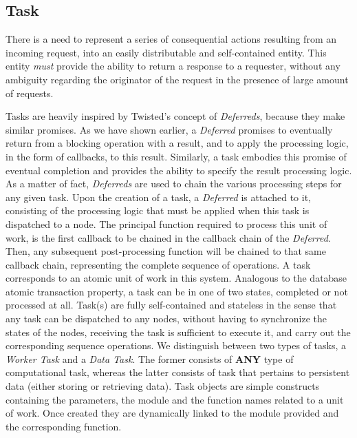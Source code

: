 \documentclass[12pt, titlepage]{uo_temp}
\begin{document}
     \subsection{Task}\label{impl_constructs_task}
     There is a need to represent a series of consequential actions resulting from an
     incoming request, into an easily distributable and self-contained entity. This entity
     \emph{must} provide the ability to return a response to a requester, without any
     ambiguity regarding the originator of the request in the presence of large amount of
     requests.
     
     Tasks are heavily inspired by Twisted's concept of \emph{Deferreds}, because they
     make similar promises. As we have shown earlier, a \emph{Deferred} promises to
     eventually return from a blocking operation with a result, and to apply the
     processing logic, in the form of callbacks, to this result. Similarly, a task
     embodies this promise of eventual completion and provides the ability to specify the
     result processing logic. As a matter of fact, \emph{Deferreds} are used to chain the
     various processing steps for any given task. Upon the creation of a task, a
     \emph{Deferred} is attached to it, consisting of the processing logic that must be
     applied when this task is dispatched to a node. The principal function required to
     process this unit of work, is the first callback to be chained in the callback chain
     of the \emph{Deferred}. Then, any subsequent post-processing function will be chained
     to that same callback chain, representing the complete sequence of operations.
     A task corresponds to an atomic unit of work in this system. Analogous to the
     database atomic transaction property, a task can be in one of two states, completed
     or not processed at all. Task(s) are fully self-contained and stateless in the sense
     that any task can be dispatched to any nodes, without having to synchronize the
     states of the nodes, receiving the task is sufficient to execute it, and carry out
     the corresponding sequence operations. We distinguish between two types of tasks, a
     \emph{Worker Task} and a \emph{Data Task}. The former consists of \textbf{ANY} type
     of computational task, whereas the latter consists of task that pertains to
     persistent data (either storing or retrieving data).
     Task objects are simple constructs containing the parameters, the module and the
     function names related to a unit of work. Once created they are dynamically linked to
     the module provided and the corresponding function.
\end{document}
